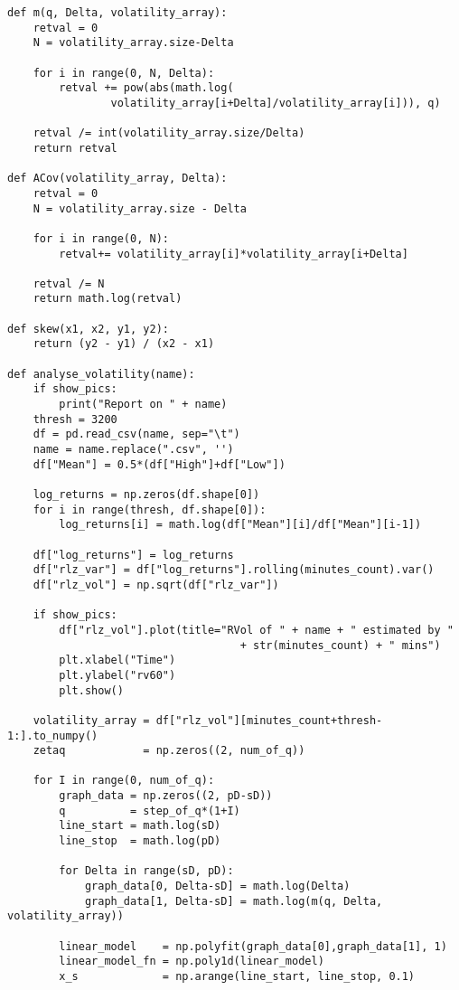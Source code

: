 \begin{verbatim}
def m(q, Delta, volatility_array):
    retval = 0
    N = volatility_array.size-Delta

    for i in range(0, N, Delta):
        retval += pow(abs(math.log(
                volatility_array[i+Delta]/volatility_array[i])), q)

    retval /= int(volatility_array.size/Delta)
    return retval

def ACov(volatility_array, Delta):
    retval = 0
    N = volatility_array.size - Delta

    for i in range(0, N):
        retval+= volatility_array[i]*volatility_array[i+Delta]

    retval /= N
    return math.log(retval)

def skew(x1, x2, y1, y2):
    return (y2 - y1) / (x2 - x1)

def analyse_volatility(name):
    if show_pics:
        print("Report on " + name)
    thresh = 3200
    df = pd.read_csv(name, sep="\t")
    name = name.replace(".csv", '')
    df["Mean"] = 0.5*(df["High"]+df["Low"])

    log_returns = np.zeros(df.shape[0])
    for i in range(thresh, df.shape[0]):
        log_returns[i] = math.log(df["Mean"][i]/df["Mean"][i-1])

    df["log_returns"] = log_returns
    df["rlz_var"] = df["log_returns"].rolling(minutes_count).var()
    df["rlz_vol"] = np.sqrt(df["rlz_var"])
    
    if show_pics:
        df["rlz_vol"].plot(title="RVol of " + name + " estimated by " 
                                    + str(minutes_count) + " mins")
        plt.xlabel("Time")
        plt.ylabel("rv60")
        plt.show()

    volatility_array = df["rlz_vol"][minutes_count+thresh-1:].to_numpy()
    zetaq            = np.zeros((2, num_of_q))
    
    for I in range(0, num_of_q):
        graph_data = np.zeros((2, pD-sD))
        q          = step_of_q*(1+I)
        line_start = math.log(sD)
        line_stop  = math.log(pD)
        
        for Delta in range(sD, pD):
            graph_data[0, Delta-sD] = math.log(Delta)
            graph_data[1, Delta-sD] = math.log(m(q, Delta, volatility_array))

        linear_model    = np.polyfit(graph_data[0],graph_data[1], 1)
        linear_model_fn = np.poly1d(linear_model)
        x_s             = np.arange(line_start, line_stop, 0.1)


\end{verbatim}

